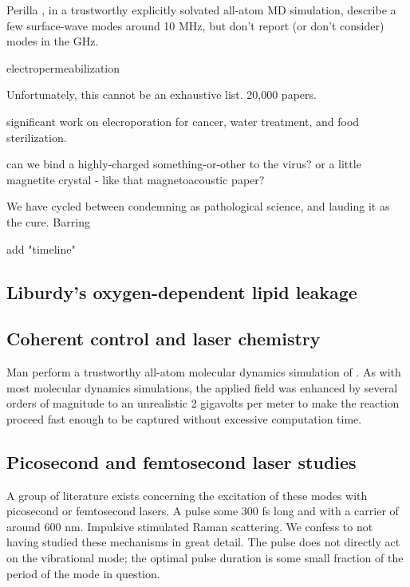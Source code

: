 \documentclass[paper.tex]{subfiles}
\begin{document}
\begin{multicols}{1}
Perilla \cite{}, in a trustworthy explicitly solvated all-atom MD simulation, describe a few surface-wave modes around 10 MHz, but don't report (or don't consider) modes in the GHz.




electropermeabilization




Unfortunately, this cannot be an exhaustive list. 20,000 papers.

significant work on elecroporation for cancer, water treatment, and food sterilization.


can we bind a highly-charged something-or-other to the virus?
or a little magnetite crystal - like that magnetoacoustic paper?


We have cycled between condemning as pathological science, and lauding it as the cure. Barring 


add "timeline"



\subsection{Liburdy's oxygen-dependent lipid leakage}



\subsection{Coherent control and laser chemistry}



Man \cite{Picosecond2016b} perform a trustworthy all-atom molecular dynamics simulation of . As with most molecular dynamics simulations, the applied field was enhanced by several orders of magnitude to an unrealistic 2 gigavolts per meter to make the reaction proceed fast enough to be captured without excessive computation time.



\subsection{Picosecond and femtosecond laser studies}

A group of literature exists concerning the excitation of these modes with picosecond or femtosecond lasers. A pulse some 300 fs long and with a carrier of around 600 nm. Impulsive stimulated Raman scattering. We confess to not having studied these mechanisms in great detail. The pulse does not directly act on the vibrational mode; the optimal pulse duration is some small fraction of the period of the mode in question.


\end{multicols}
\end{document}
